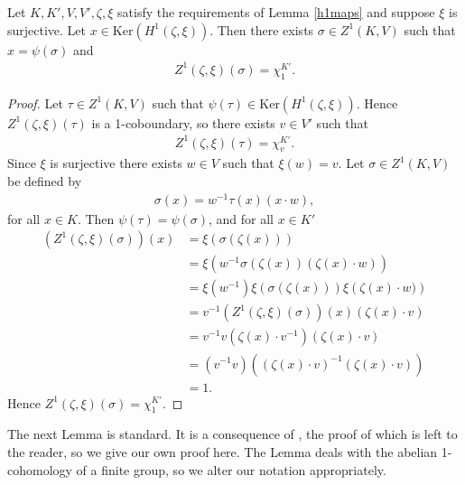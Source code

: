 \begin{lemma}\label{kerh1} Let $K, K', V, V', \zeta, \xi$ satisfy the requirements of Lemma \ref{h1maps} and suppose $\xi$ is surjective. 
Let $x\in \mathrm{Ker}\left(H^1(\zeta, \xi)\right)$. Then there exists $\sigma \in Z^1(K, V)$ such that $x = \psi(\sigma)$ and
\begin{align*}
	Z^1(\zeta, \xi)(\sigma) = \chi^{K'}_1.
\end{align*}
\end{lemma}
\begin{proof}
	Let $\tau \in Z^1(K, V)$ such that $\psi(\tau) \in \mathrm{Ker}\left(H^1(\zeta, \xi)\right)$. Hence $Z^1(\zeta, \xi)(\tau)$ is a 1-coboundary, so there exists $v \in V'$ such that
\begin{align*}
	Z^1(\zeta, \xi)(\tau) = \chi^{K'}_v.
\end{align*}
Since $\xi$ is surjective there exists $w \in V$ such that $\xi(w) = v$.
Let $\sigma \in Z^1(K, V)$ be defined by
\begin{align*}
	\sigma(x) = w^{-1}\tau(x)(x \cdot w),
\end{align*}
for all $x \in K$. Then $\psi(\tau) = \psi(\sigma)$, and for all $x \in K'$
\begin{align*}
	\left(Z^1(\zeta, \xi)(\sigma)\right)(x) &= \xi\left(\sigma(\zeta(x))\right) \\
		&= \xi\left(w^{-1}\sigma(\zeta(x))(\zeta(x)\cdot w )\right) \\
		&= \xi\left(w^{-1}\right)\xi\left(\sigma(\zeta(x))\right)\xi\left(\zeta(x)\cdot w )\right) \\
		&= v^{-1} \left(Z^1(\zeta, \xi)(\sigma)\right)(x) (\zeta(x) \cdot v ) \\
		&= v^{-1} v(\zeta(x) \cdot v^{-1}) (\zeta(x) \cdot v ) \\
		&= (v^{-1} v) \left((\zeta(x) \cdot v)^{-1} (\zeta(x) \cdot v )\right) \\
		&= 1.
\end{align*}
	Hence $Z^1(\zeta, \xi)(\sigma) = \chi^{K'}_1$.
\end{proof}

The next Lemma is standard. It is a consequence of \cite[III.9.5(ii)]{brown1982cohomology}, the proof of which is left to the reader, so we give our own proof here. The Lemma deals with the abelian 1-cohomology of a finite group, so we alter our notation appropriately.

